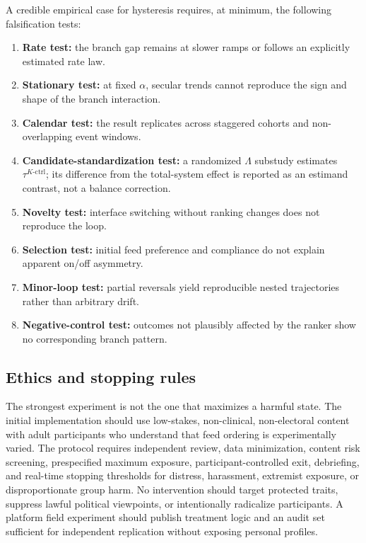 \documentclass[10pt,a4paper]{article}
\begin{document}
A credible empirical case for hysteresis requires, at minimum, the following falsification tests:
\begin{enumerate}
  \item \textbf{Rate test:} the branch gap remains at slower ramps or follows an explicitly estimated rate law.
  \item \textbf{Stationary test:} at fixed $\alpha$, secular trends cannot reproduce the sign and shape of the branch interaction.
  \item \textbf{Calendar test:} the result replicates across staggered cohorts and non-overlapping event windows.
  \item \textbf{Candidate-standardization test:} a randomized $\Lambda$ substudy estimates $\tau^{K\text{-}\mathrm{ctrl}}$; its difference from the total-system effect is reported as an estimand contrast, not a balance correction.
  \item \textbf{Novelty test:} interface switching without ranking changes does not reproduce the loop.
  \item \textbf{Selection test:} initial feed preference and compliance do not explain apparent on/off asymmetry.
  \item \textbf{Minor-loop test:} partial reversals yield reproducible nested trajectories rather than arbitrary drift.
  \item \textbf{Negative-control test:} outcomes not plausibly affected by the ranker show no corresponding branch pattern.
\end{enumerate}

\subsection{Ethics and stopping rules}

The strongest experiment is not the one that maximizes a harmful state. The initial implementation should use low-stakes, non-clinical, non-electoral content with adult participants who understand that feed ordering is experimentally varied. The protocol requires independent review, data minimization, content risk screening, prespecified maximum exposure, participant-controlled exit, debriefing, and real-time stopping thresholds for distress, harassment, extremist exposure, or disproportionate group harm. No intervention should target protected traits, suppress lawful political viewpoints, or intentionally radicalize participants. A platform field experiment should publish treatment logic and an audit set sufficient for independent replication without exposing personal profiles.
\end{document}
